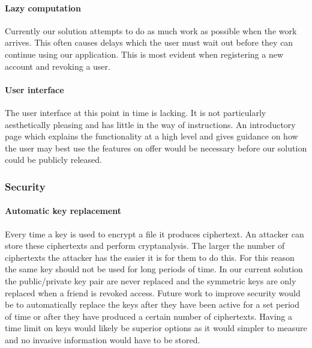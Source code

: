 \documentclass[12pt, titlepage]{article}
\begin{document}
\paragraph*{Lazy computation} Currently our solution attempts to do as much work as possible when the work arrives. This often causes delays which the user must wait out before they can continue using our application. This is most evident when registering a new account and revoking a user.
\paragraph*{User interface} The user interface at this point in time is lacking. It is not particularly aesthetically pleasing and has little in the way of instructions. An introductory page which explains the functionality at a high level and gives guidance on how the user may best use the features on offer would be necessary before our solution could be publicly released.

\subsubsection*{Security}
\paragraph*{Automatic key replacement} Every time a key is used to encrypt a file it produces ciphertext. An attacker can store these ciphertexts and perform cryptanalysis. The larger the number of ciphertexts the attacker has the easier it is for them to do this. For this reason the same key should not be used for long periods of time. In our current solution the public/private key pair are never replaced and the symmetric keys are only replaced when a friend is revoked access. Future work to improve security would be to automatically replace the keys after they have been active for a set period of time or after they have produced a certain number of ciphertexts. Having a time limit on keys would likely be superior options as it would simpler to measure and no invasive information would have to be stored.
\end{document}
